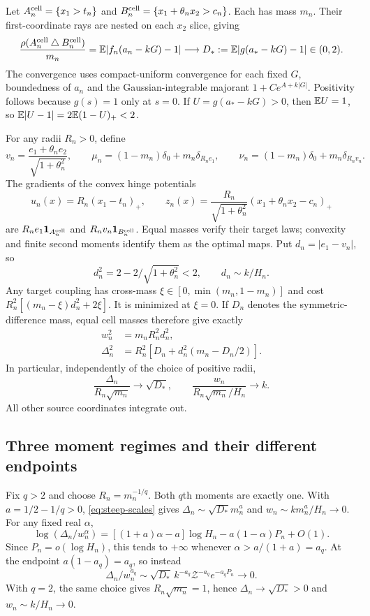 \documentclass[11pt]{article}
\numberwithin{equation}{section}
\theoremstyle{remark}\newtheorem{remark}[theorem]{Remark}
\newcommand{\ind}{\mathbf 1}\newcommand{\norm}[1]{\left\lVert#1\right\rVert}
\begin{document}
Let $A_n^{\rm cell}=\{x_1>t_n\}$ and $B_n^{\rm cell}=\{x_1+\theta_nx_2>c_n\}$. Each has mass $m_n$. Their first-coordinate rays are nested on each $x_2$ slice, giving
\[
 \frac{\rho(A_n^{\rm cell}\mathbin\triangle B_n^{\rm cell})}{m_n}
 =\mathbb E|f_n(a_n-kG)-1|\longrightarrow
 D_*:=\mathbb E|g(a_*-kG)-1|\in(0,2).
\]
The convergence uses compact-uniform convergence for each fixed $G$, boundedness of $a_n$ and the Gaussian-integrable majorant $1+Ce^{A+k|G|}$. Positivity follows because $g(s)=1$ only at $s=0$. If $U=g(a_*-kG)>0$, then $\mathbb E U=1$, so $\mathbb E|U-1|=2\mathbb E(1-U)_+<2$.

For any radii $R_n>0$, define
\begin{equation}\label{eq:steep-targets}
 v_n=\frac{e_1+\theta_ne_2}{\sqrt{1+\theta_n^2}},\qquad
 \mu_n=(1-m_n)\delta_0+m_n\delta_{R_ne_1},\qquad
 \nu_n=(1-m_n)\delta_0+m_n\delta_{R_nv_n}.
\end{equation}
The gradients of the convex hinge potentials
\[
 u_n(x)=R_n(x_1-t_n)_+,\qquad
 z_n(x)=\frac{R_n}{\sqrt{1+\theta_n^2}}
                  (x_1+\theta_nx_2-c_n)_+
\]
are $R_ne_1\ind_{A_n^{\rm cell}}$ and $R_nv_n\ind_{B_n^{\rm cell}}$. Equal masses verify their target laws; convexity and finite second moments identify them as the optimal maps. Put $d_n=|e_1-v_n|$, so
\[
 d_n^2=2-2/\sqrt{1+\theta_n^2}<2,\qquad d_n\sim k/H_n.
\]
Any target coupling has cross-mass $\xi\in[0,\min(m_n,1-m_n)]$ and cost
$R_n^2[(m_n-\xi)d_n^2+2\xi]$. It is minimized at $\xi=0$. If $D_n$ denotes the symmetric-difference mass, equal cell masses therefore give exactly
\begin{align}
 w_n^2&=m_nR_n^2d_n^2,\label{eq:steep-W}\\
 \Delta_n^2&=R_n^2[D_n+d_n^2(m_n-D_n/2)].\label{eq:steep-map}
\end{align}
In particular, independently of the choice of positive radii,
\begin{equation}\label{eq:steep-scales}
 \frac{\Delta_n}{R_n\sqrt{m_n}}\longrightarrow\sqrt{D_*},\qquad
 \frac{w_n}{R_n\sqrt{m_n}/H_n}\longrightarrow k.
\end{equation}
All other source coordinates integrate out.

\subsection{Three moment regimes and their different endpoints}
Fix $q>2$ and choose $R_n=m_n^{-1/q}$. Both $q$th moments are exactly one. With $a=1/2-1/q>0$, \eqref{eq:steep-scales} gives
$\Delta_n\sim\sqrt{D_*}m_n^a$ and $w_n\sim k m_n^a/H_n\to0$. For any fixed real $\alpha$,
\begin{equation}\label{eq:steep-q-ratio}
 \log(\Delta_n/w_n^\alpha)
 =[(1+a)\alpha-a]\log H_n-a(1-\alpha)P_n+O(1).
\end{equation}
Since $P_n=o(\log H_n)$, this tends to $+\infty$ whenever
$\alpha>a/(1+a)=a_q$. At the endpoint $a(1-a_q)=a_q$, so instead
\begin{equation}\label{eq:steep-q-endpoint}
 \Delta_n/w_n^{a_q}
 \sim\sqrt{D_*}\,k^{-a_q}\mathcal Z^{-a_q}e^{-a_qP_n}\longrightarrow0.
\end{equation}
With $q=2$, the same choice gives $R_n\sqrt{m_n}=1$, hence $\Delta_n\to\sqrt{D_*}>0$ and $w_n\sim k/H_n\to0$.
\end{document}
